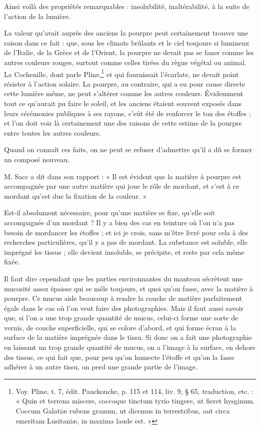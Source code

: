 \documentclass[a4paper, 11pt, oneside, polutonikogreek, french]{article}
\begin{document}
Ainsi voilà des propriétés remarquables : insolubilité, inaltérabilité, à la suite de l'action de la lumière.

La valeur qu'avait auprès des anciens la pourpre peut certainement trouver une raison dans ce fait : que, sous les climats brûlants et le ciel toujours si lumineux de l'Italie, de la Grèce et de l'Orient, la pourpre ne devait pas se faner comme les autres couleurs rouges, surtout comme celles tirées du règne végétal ou animal. La Cochenille, dont parle Pline,\footnote{Voy. Pline, t. 7, édit. Panckoucke, p. 115 et 114, liv. 9, § 65, traduction, etc. : « Quin et terrena miscere, coccoque tinctum tyrio tingere, ut fieret hysginum. Coccum Galatiæ rubens granum, ut dicemus in terrestribus, aut circa emeritam Lusitaniæ, in maxima laude est. »} et qui fournissait l'écarlate, ne devait point résister à l'action solaire. La pourpre, au contraire, qui a eu pour cause directe cette lumière même, ne peut s'altérer comme les autres couleurs. Évidemment tout ce qu'aurait pu faire le soleil, et les anciens étaient souvent exposés dans leurs cérémonies publiques à ses rayons, c'eût été de renforcer le ton des étoffes ; et l'on doit voir là certainement une des raisons de cette estime de la pourpre entre toutes les autres couleurs.

Quand on connaît ces faits, on ne peut se refuser d'admettre qu'il a dû se former un composé nouveau.

M. Sacc a dit dans son rapport : « Il est évident que la matière à pourpre est accompagnée par une autre matière qui joue le rôle de mordant, et c'est à ce mordant qu'est due la fixation de la couleur. »

Est-il absolument nécessaire, pour qu'une matière se fixe, qu'elle soit accompagnée d'un mordant ? Il y a bien des cas en teinture où l'on n'a pas besoin de mordancer les étoffes ; et ici je crois, sans m'être livré pour cela à des recherches particulières, qu'il y a pas de mordant. La substance est soluble, elle imprégné les tissus ; elle devient insoluble, se précipite, et reste par cela même fixée.

Il faut dire cependant que les parties environnantes du manteau sécrètent une mucosité assez épaisse qui se mêle toujours, et quoi qu'on fasse, avec la matière à pourpre. Ce mucus aide beaucoup à rendre la couche de matière parfaitement égale dans le cas où l'on veut faire des photographies. Mais il faut aussi savoir que, si l'on a une trop grande quantité de mucus, celui-ci forme une sorte de vernis, de couche superficielle, qui se colore d'abord, et qui forme écran à la surface de la matière imprégnée dans le tissu. Si donc on a fait une photographie en laissant un trop grande quantité de mucus, on a l'image à la surface, en dehors des tissus, ce qui fait que, pour peu qu'on humecte l'étoffe et qu'on la fasse adhérer à un autre tissu, on perd une grande partie de l'image.
\end{document}
